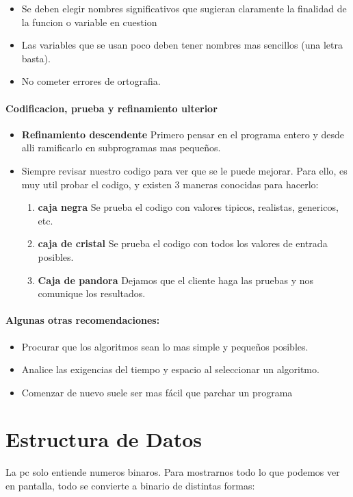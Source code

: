 \documentclass[10pt]{article}
\begin{document}
\begin{itemize}
	\item Se deben elegir nombres significativos que sugieran claramente la finalidad de la funcion
	o variable en cuestion
	\item Las variables que se usan poco deben tener nombres mas sencillos (una letra basta).
	\item No cometer errores de ortografia.
\end{itemize}

\paragraph{Codificacion, prueba y refinamiento ulterior}
\begin{itemize}
	\item \textbf{Refinamiento descendente} Primero pensar en el programa entero y desde alli ramificarlo en subprogramas mas 		pequeños.
	\item Siempre revisar nuestro codigo para ver que se le puede mejorar. Para ello, es muy util probar el codigo, y existen 3 maneras conocidas para hacerlo:
	\begin{enumerate}
		\item \textbf{caja negra} Se prueba el codigo con valores tipicos, realistas, genericos, etc.
		\item  \textbf{caja de cristal} Se prueba el codigo con todos los valores de entrada posibles.
		\item \textbf{Caja de pandora} Dejamos que el cliente haga las pruebas y nos comunique los resultados.
	\end{enumerate}
\end{itemize}

\paragraph{Algunas otras recomendaciones:}

\begin{itemize}
	\item Procurar que los algoritmos sean lo mas simple y pequeños posibles.
	\item Analice las exigencias del tiempo y espacio al seleccionar un algoritmo.
	\item Comenzar de nuevo suele ser mas fácil que parchar un programa
\end{itemize}

\section{Estructura de Datos}
La pc solo entiende numeros binaros. Para mostrarnos todo lo que podemos ver en pantalla, todo se convierte a binario de distintas formas:
\end{document}
